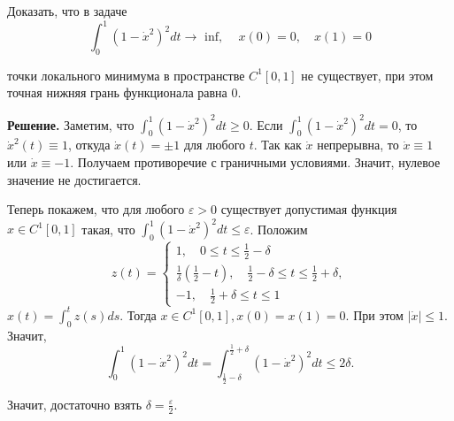 \begin{task}
    Доказать, что в задаче
    $$
    \int_0^1\left(1-\dot{x}^2\right)^2 d t \rightarrow \text { inf, } \quad x(0)=0, \quad x(1)=0
    $$
    
    точки локального минимума в пространстве $C^1[0,1]$ не существует, при этом точная нижняя грань функционала равна 0.
    
    \textbf{Решение.} Заметим, что $\int_0^1\left(1-\dot{x}^2\right)^2 d t \geqslant 0$. Если $\int_0^1\left(1-\dot{x}^2\right)^2 d t=0$, то $\dot{x}^2(t) \equiv 1$, откуда $\dot{x}(t)= \pm 1$ для любого $t$. Так как $\dot{x}$ непрерывна, то $\dot{x} \equiv 1$ или $\dot{x} \equiv-1$. Получаем противоречие с граничными условиями. Значит, нулевое значение не достигается.
    
    Теперь покажем, что для любого $\varepsilon>0$ существует допустимая функция $x \in C^1[0,1]$ такая, что $\int_0^1\left(1-\dot{x}^2\right)^2 d t \leqslant \varepsilon$. Положим
    $$
    z(t)=\left\{\begin{array}{l}
    1, \quad 0 \leqslant t \leqslant \frac{1}{2}-\delta \\
    \frac{1}{\delta}\left(\frac{1}{2}-t\right), \quad \frac{1}{2}-\delta \leqslant t \leqslant \frac{1}{2}+\delta, \\
    -1, \quad \frac{1}{2}+\delta \leqslant t \leqslant 1
    \end{array}\right.
    $$
    $x(t)=\int_0^t z(s) d s$. Тогда $x \in C^1[0,1], x(0)=x(1)=0$. При этом $|\dot{x}| \leqslant 1$. Значит,
    $$
    \int_0^1\left(1-\dot{x}^2\right)^2 d t=\int_{\frac{1}{2}-\delta}^{\frac{1}{2}+\delta}\left(1-\dot{x}^2\right)^2 d t \leqslant 2 \delta .
    $$
    
    Значит, достаточно взять $\delta=\frac{\varepsilon}{2}$.
\end{task}